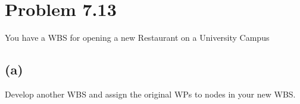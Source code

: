 \documentclass{article}
\begin{document}
	\section*{Problem 7.13}
	You have a WBS for opening a new Restaurant on a University Campus
	\subsection*{\quad(a)}
	Develop another WBS and assign the original WPs to nodes in your new WBS.
\end{document}
